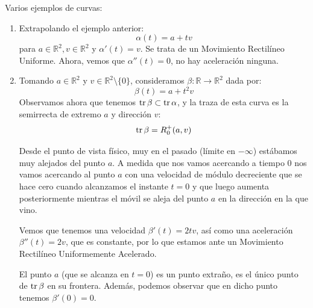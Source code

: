 \begin{ejemplo}
    Varios ejemplos de curvas:
    \begin{enumerate}
        \item Extrapolando el ejemplo anterior:
            \begin{equation*}
                \alpha(t) = a + tv
            \end{equation*}
            para $a\in \mathbb{R}^2, v\in \mathbb{R}^2$ y $\alpha'(t) = v$. Se trata de un Movimiento Rectilíneo Uniforme. Ahora, vemos que $\alpha''(t) = 0$, no hay aceleración ninguna.
        \item Tomando $a\in \mathbb{R}^2$ y $v\in \mathbb{R}^2\setminus \{0\}$, consideramos $\beta:\mathbb{R}\to \mathbb{R}^2$ dada por:
            \begin{equation*}
                \beta(t) = a+t^2v
            \end{equation*}
            Observamos ahora que tenemos $\operatorname{tr} \beta\subset \operatorname{tr} \alpha$, y la traza de esta curva es la semirrecta de extremo $a$ y dirección $v$:
            \begin{equation*}
                \operatorname{tr} \beta = R_0^+(a,v) 
            \end{equation*}
            \begin{figure}[H]
                \centering
            \end{figure}

            Desde el punto de vista físico, muy en el pasado (límite en $-\infty$) estábamos muy alejados del punto $a$. A medida que nos vamos acercando a tiempo $0$ nos vamos acercando al punto $a$ con una velocidad de módulo decreciente que se hace cero cuando alcanzamos el instante $t=0$ y que luego aumenta posteriormente mientras el móvil se aleja del punto $a$ en la dirección en la que vino.

            Vemos que tenemos una velocidad $\beta'(t) = 2tv$, así como una aceleración $\beta''(t) = 2v$, que es constante, por lo que estamos ante un Movimiento Rectilíneo Uniformemente Acelerado.

            El punto $a$ (que se alcanza en $t=0$) es un punto extraño, es el único punto de $\operatorname{tr} \beta$ en su frontera. Además, podemos observar que en dicho punto tenemos $\beta'(0) = 0$.
    \end{enumerate}
\end{ejemplo}

